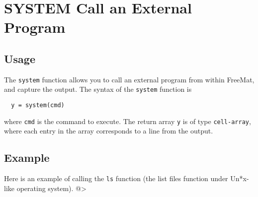 \section{SYSTEM Call an External Program}

\subsection{Usage}

The \verb|system| function allows you to call an external
program from within FreeMat, and capture the output.
The syntax of the \verb|system| function is
\begin{verbatim}
  y = system(cmd)
\end{verbatim}
where \verb|cmd| is the command to execute.  The return
array \verb|y| is of type \verb|cell-array|, where each entry
in the array corresponds to a line from the output.
\subsection{Example}

Here is an example of calling the \verb|ls| function (the
list files function under Un*x-like operating system).
@>
